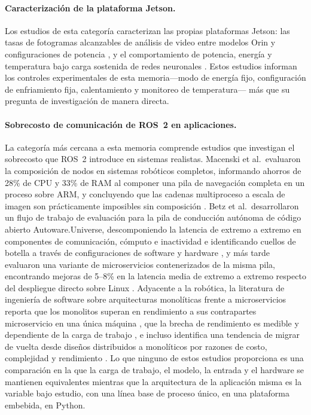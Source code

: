 \paragraph{Caracterización de la plataforma Jetson.}
Los estudios de esta categoría caracterizan las propias plataformas Jetson:
las tasas de fotogramas alcanzables de análisis de video entre modelos Orin
y configuraciones de potencia \cite{scalcon2024}, y el comportamiento de
potencia, energía y temperatura bajo carga sostenida de redes neuronales
\cite{tang2026}. Estos estudios informan los controles experimentales de
esta memoria---modo de energía fijo, configuración de enfriamiento fija,
calentamiento y monitoreo de temperatura--- más que su pregunta de
investigación de manera directa.

\paragraph{Sobrecosto de comunicación de ROS~2 en aplicaciones.}
La categoría más cercana a esta memoria comprende estudios que investigan el
sobrecosto que ROS~2 introduce en sistemas realistas. Macenski et al.\
evaluaron la composición de nodos en sistemas robóticos completos,
informando ahorros de 28\% de CPU y 33\% de RAM al componer una pila de
navegación completa en un proceso sobre ARM, y concluyendo que las cadenas
multiproceso a escala de imagen son prácticamente imposibles sin composición
\cite{macenski2023}. Betz et al.\ desarrollaron un flujo de trabajo de
evaluación para la pila de conducción autónoma de código abierto
Autoware.Universe, descomponiendo la latencia de extremo a extremo en
componentes de comunicación, cómputo e inactividad e identificando cuellos
de botella a través de configuraciones de software y hardware
\cite{betz2023a}, y más tarde evaluaron una variante de microservicios
contenerizados de la misma pila, encontrando mejoras de 5--8\% en la
latencia media de extremo a extremo respecto del despliegue directo sobre
Linux \cite{betz2024}. Adyacente a la robótica, la literatura de ingeniería
de software sobre arquitecturas monolíticas frente a microservicios reporta
que los monolitos superan en rendimiento a sus contrapartes microservicio en
una única máquina \cite{blinowski2022}, que la brecha de rendimiento es
medible y dependiente de la carga de trabajo \cite{tapia2020}, e incluso
identifica una tendencia de migrar de vuelta desde diseños distribuidos a
monolíticos por razones de costo, complejidad y rendimiento
\cite{felisberto2024}. Lo que ninguno de estos estudios proporciona es una
comparación en la que la carga de trabajo, el modelo, la entrada y el
hardware se mantienen equivalentes mientras que la arquitectura de la
aplicación misma es la variable bajo estudio, con una línea base de proceso
único, en una plataforma embebida, en Python.

